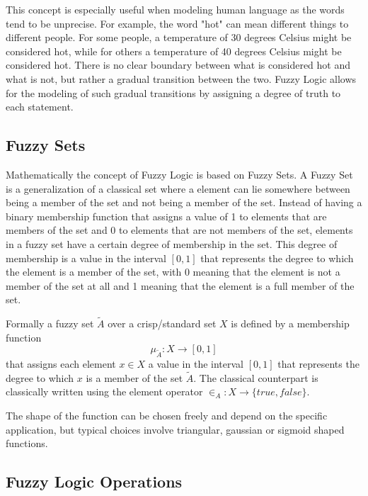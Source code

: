 This concept is especially useful when modeling human language as the words tend to be unprecise. For example, the word "hot" can mean different things to different people. For some people, a temperature of 30 degrees Celsius might be considered hot, while for others a temperature of 40 degrees Celsius might be considered hot. There is no clear boundary between what is considered hot and what is not, but rather a gradual transition between the two. Fuzzy Logic allows for the modeling of such gradual transitions by assigning a degree of truth to each statement.



\subsection{Fuzzy Sets}

Mathematically the concept of Fuzzy Logic is based on Fuzzy Sets. A Fuzzy Set is a generalization of a classical set where a element can lie somewhere between being a member of the set and not being a member of the set. Instead of having a binary membership function that assigns a value of 1 to elements that are members of the set and 0 to elements that are not members of the set, elements in a fuzzy set have a certain degree of membership in the set. This degree of membership is a value in the interval $[0, 1]$ that represents the degree to which the element is a member of the set, with 0 meaning that the element is not a member of the set at all and 1 meaning that the element is a full member of the set.


Formally a fuzzy set $\tilde{A}$ over a crisp/standard set $X$ is defined by a membership function
\begin{equation}
      \mu_{\tilde{A}}: X \rightarrow [0, 1]
\end{equation}
that assigns each element $x \in X$ a value in the interval $[0, 1]$ that represents the degree to which $x$ is a member of the set $\tilde{A}$. The classical counterpart is classically written using the element operator $\in_A : X \rightarrow \{true,false\}$.

The shape of the function can be chosen freely and depend on the specific application, but typical choices involve triangular, gaussian or sigmoid shaped functions.



\subsection{Fuzzy Logic Operations}

